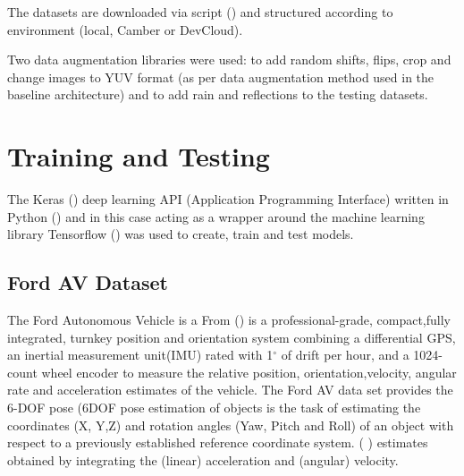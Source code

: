The datasets are downloaded via script (\cite{Sikar2020}) and structured according to environment (local, Camber or DevCloud).

Two data augmentation libraries were used: \cite{Naoki2016} to add random shifts, flips, crop and change images to YUV format (as per \cite{bojarski2016end} data augmentation method used in the baseline architecture) and \cite{Saxena2017} to add rain and reflections to the testing datasets.

\section{Training and Testing}
The Keras (\cite{chollet2015keras}) deep learning API (Application Programming Interface) written in Python (\cite{van1995python}) and in this case acting as a wrapper around the machine learning library Tensorflow (\cite{abadi2016tensorflow})  was used to create, train and test models.

\subsection{Ford AV Dataset}
The Ford Autonomous Vehicle is a 
From %
 (\cite{Applanix}) is a professional-grade, compact,fully  integrated,  turnkey  position  and  orientation  system combining a differential GPS, an inertial measurement unit(IMU)  rated  with  1$^{\circ}$ of  drift  per  hour,  and  a  1024-count wheel encoder to measure the relative position, orientation,velocity,  angular  rate  and  acceleration  estimates  of  the vehicle. The Ford AV data set provides the 6-DOF pose (6DOF pose estimation of objects is the task of estimating the coordinates (X, Y,Z) and rotation angles (Yaw, Pitch and Roll) of an object with respect to a previously established reference coordinate system. (\cite{7005077} ) estimates obtained by integrating the (linear) acceleration and (angular) velocity.



